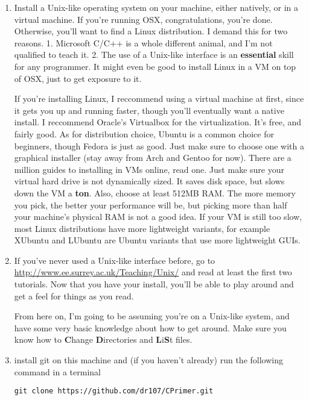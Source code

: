 \documentclass[ebook,11pt,oneside,openany]{memoir}
\begin{document}
\begin{enumerate}
\item Install a Unix-like operating system on your machine, either natively, or in a virtual machine. If you're running OSX, congratulations, you're done. Otherwise, you'll want to find a Linux distribution. I demand this for two reasons. 1. Microsoft C/C++ is a whole different animal, and I'm not qualified to teach it. 2. The use of a Unix-like interface is an \textbf{essential} skill for any programmer. It might even be good to install Linux in a VM on top of OSX, just to get exposure to it.

If you're installing Linux, I reccommend using a virtual machine at first, since it gets you up and running faster, though you'll eventually want a native install. I reccommend Oracle's Virtualbox for the virtualization. It's free, and fairly good. As for distribution choice, Ubuntu is a common choice for beginners, though Fedora is just as good. Just make sure to choose one with a graphical installer (stay away from Arch and Gentoo for now). There are a million guides to installing in VMs online, read one. Just make sure your virtual hard drive is not dynamically sized. It saves disk space, but slows down the VM a \textbf{ton}. Also, choose at least 512MB RAM. The more memory you pick, the better your performance will be, but picking more than half your machine's physical RAM is not a good idea. If your VM is still too slow, most Linux distributions have more lightweight variants, for example XUbuntu and LUbuntu are Ubuntu variants that use more lightweight GUIs.

\item If you've never used a Unix-like interface before, go to \url{http://www.ee.surrey.ac.uk/Teaching/Unix/} and read at least the first two tutorials. Now that you have your install, you'll be able to play around and get a feel for things as you read. 

From here on, I'm going to be assuming you're on a Unix-like system, and have some very basic knowledge about how to get around. Make sure you know how to \textbf{C}hange \textbf{D}irectories and \textbf{L}i\textbf{S}t files.

\item install git on this machine and (if you haven't already) run the following command in a terminal
\begin{verbatim}
git clone https://github.com/dr107/CPrimer.git 
\end{verbatim}


\end{enumerate}
\end{document}
